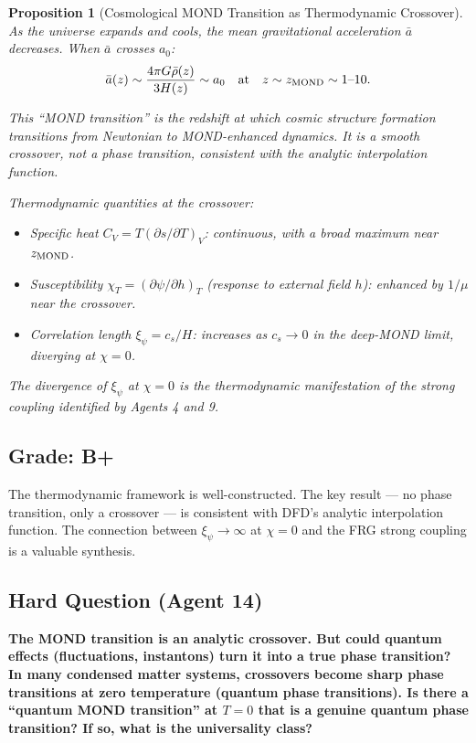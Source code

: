\documentclass[11pt,a4paper]{article}
\newtheorem{proposition}{Proposition}
\begin{document}
\begin{proposition}[Cosmological MOND Transition as Thermodynamic Crossover]
\label{prop:cosmo-transition}
As the universe expands and cools, the mean gravitational acceleration $\bar{a}$ decreases. When $\bar{a}$ crosses $a_0$:
\begin{equation}
\bar{a}(z) \sim \frac{4\pi G\bar\rho(z)}{3H(z)} \sim a_0 \quad\text{at}\quad z \sim z_{\rm MOND} \sim 1\text{--}10.
\end{equation}

This ``MOND transition'' is the redshift at which cosmic structure formation transitions from Newtonian to MOND-enhanced dynamics. It is a smooth crossover, not a phase transition, consistent with the analytic interpolation function.

Thermodynamic quantities at the crossover:
\begin{itemize}
\item Specific heat $C_V = T(\partial s/\partial T)_V$: continuous, with a broad maximum near $z_{\rm MOND}$.
\item Susceptibility $\chi_T = (\partial\psi/\partial h)_T$ (response to external field $h$): enhanced by $1/\mu$ near the crossover.
\item Correlation length $\xi_\psi = c_s/H$: increases as $c_s \to 0$ in the deep-MOND limit, diverging at $\chi = 0$.
\end{itemize}

The divergence of $\xi_\psi$ at $\chi = 0$ is the thermodynamic manifestation of the strong coupling identified by Agents 4 and 9.
\end{proposition}

\subsection{Grade: B+}

The thermodynamic framework is well-constructed. The key result --- no phase transition, only a crossover --- is consistent with DFD's analytic interpolation function. The connection between $\xi_\psi \to \infty$ at $\chi = 0$ and the FRG strong coupling is a valuable synthesis.

\subsection{Hard Question (Agent 14)}

\textbf{The MOND transition is an analytic crossover. But could quantum effects (fluctuations, instantons) turn it into a true phase transition? In many condensed matter systems, crossovers become sharp phase transitions at zero temperature (quantum phase transitions). Is there a ``quantum MOND transition'' at $T = 0$ that is a genuine quantum phase transition? If so, what is the universality class?}
\end{document}
